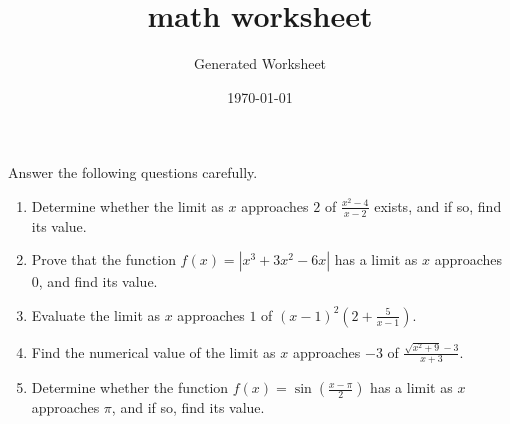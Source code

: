 \documentclass{article}
\begin{document}
\title{ math worksheet }
\author{Generated Worksheet}
\date{\today}

\maketitle

Answer the following questions carefully.

\begin{enumerate}
Here are five math questions about limits at a hard difficulty level for grade 12 students: \item Determine whether the limit as $ x $ approaches $ 2 $ of $ \frac{x^2 - 4}{x-2} $ exists, and if so, find its value. \item Prove that the function $ f(x) = \left| x^3 + 3x^2 - 6x \right| $ has a limit as $ x $ approaches $ 0 $, and find its value. \item Evaluate the limit as $ x $ approaches $ 1 $ of $ (x-1)^2 \left( 2+\frac{5}{x-1} \right) $. \item Find the numerical value of the limit as $ x $ approaches $ -3 $ of $ \frac{\sqrt{x^2+9}-3}{x+3} $. \item Determine whether the function $ f(x) = \sin\left( \frac{x-\pi}{2} \right) $ has a limit as $ x $ approaches $ \pi $, and if so, find its value.
\end{enumerate}
\end{document}

